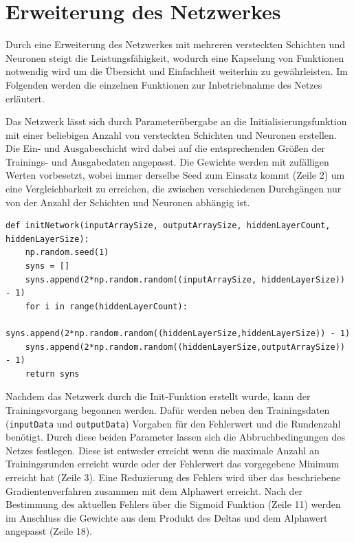 \newpage
\section{Erweiterung des Netzwerkes}
Durch eine Erweiterung des Netzwerkes mit mehreren versteckten Schichten und Neuronen steigt die Leistungsfähigkeit, wodurch eine Kapselung von Funktionen notwendig wird um die Übersicht und Einfachheit weiterhin zu gewährleisten. Im Folgenden werden die einzelnen Funktionen zur Inbetriebnahme des Netzes erläutert.

Das Netzwerk lässt sich durch Parameterübergabe an die Initialisierungsfunktion  mit einer beliebigen Anzahl von versteckten Schichten und Neuronen erstellen. Die Ein- und Ausgabeschicht wird dabei auf die entsprechenden Größen der Trainings- und Ausgabedaten angepasst. Die Gewichte werden mit zufälligen Werten vorbesetzt, wobei immer derselbe Seed zum Einsatz kommt (Zeile 2) um eine Vergleichbarkeit zu erreichen, die zwischen verschiedenen Durchgängen nur von der Anzahl der Schichten und Neuronen abhängig ist.

\begin{lstlisting}[caption={Initialisierung des Netzes},label={init}]
def initNetwork(inputArraySize, outputArraySize, hiddenLayerCount, hiddenLayerSize):
    np.random.seed(1)
    syns = []
    syns.append(2*np.random.random((inputArraySize, hiddenLayerSize)) - 1)
    for i in range(hiddenLayerCount):
        syns.append(2*np.random.random((hiddenLayerSize,hiddenLayerSize)) - 1)
    syns.append(2*np.random.random((hiddenLayerSize,outputArraySize)) - 1)
    return syns
\end{lstlisting}        

Nachdem das Netzwerk durch die Init-Funktion erstellt wurde, kann der Trainingsvorgang begonnen  werden. Dafür werden neben den Trainingsdaten (\texttt{inputData} und \texttt{outputData}) Vorgaben für den Fehlerwert und die Rundenzahl benötigt. Durch diese beiden Parameter lassen sich die Abbruchbedingungen des Netzes festlegen. Diese ist entweder erreicht wenn die maximale Anzahl an Trainingsrunden erreicht wurde oder der Fehlerwert das vorgegebene Minimum erreicht hat (Zeile 3). Eine Reduzierung des Fehlers wird über das beschriebene Gradientenverfahren  zusammen mit dem Alphawert erreicht. Nach der Bestimmung des aktuellen Fehlers über die Sigmoid Funktion (Zeile 11) werden im Anschluss die Gewichte aus dem Produkt des Deltas und dem Alphawert angepasst (Zeile 18).

